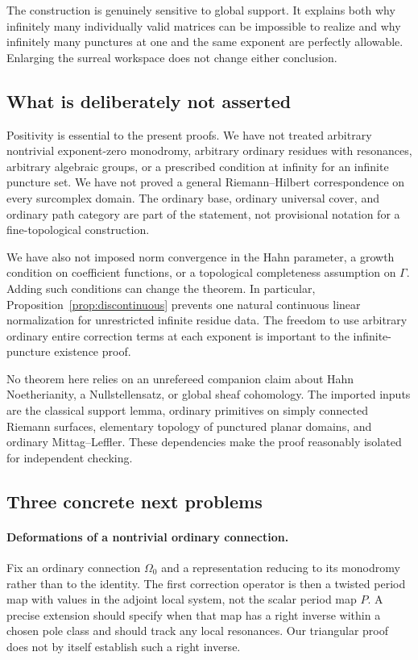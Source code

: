 \documentclass[11pt,letterpaper]{article}
\numberwithin{equation}{section}
\theoremstyle{definition}
\theoremstyle{remark}
\begin{document}
The construction is genuinely sensitive to global support. It explains both
why infinitely many individually valid matrices can be impossible to realize
and why infinitely many punctures at one and the same exponent are
perfectly allowable. Enlarging the surreal workspace does not change either
conclusion.

\subsection{What is deliberately not asserted}
Positivity is essential to the present proofs. We have not treated arbitrary
nontrivial exponent-zero monodromy, arbitrary ordinary residues with
resonances, arbitrary algebraic groups, or a prescribed condition at
infinity for an infinite puncture set. We have not proved a general
Riemann--Hilbert correspondence on every surcomplex domain. The ordinary
base, ordinary universal cover, and ordinary path category are part of the
statement, not provisional notation for a fine-topological construction.

We have also not imposed norm convergence in the Hahn parameter, a growth
condition on coefficient functions, or a topological completeness assumption
on $\Gamma$. Adding such conditions can change the theorem. In particular,
Proposition~\ref{prop:discontinuous} prevents one natural continuous linear
normalization for unrestricted infinite residue data. The freedom to use
arbitrary ordinary entire correction terms at each exponent is important to
the infinite-puncture existence proof.

No theorem here relies on an unrefereed companion claim about Hahn
Noetherianity, a Nullstellensatz, or global sheaf cohomology. The imported
inputs are the classical support lemma, ordinary primitives on simply
connected Riemann surfaces, elementary topology of punctured planar
domains, and ordinary Mittag--Leffler. These dependencies make the proof
reasonably isolated for independent checking.

\subsection{Three concrete next problems}
\paragraph{Deformations of a nontrivial ordinary connection.}
Fix an ordinary connection $\Omega_0$ and a representation reducing to its
monodromy rather than to the identity. The first correction operator is
then a twisted period map with values in the adjoint local system, not the
scalar period map $P$. A precise extension should specify when that map has
a right inverse within a chosen pole class and should track any local
resonances. Our triangular proof does not by itself establish such a
right inverse.
\end{document}
